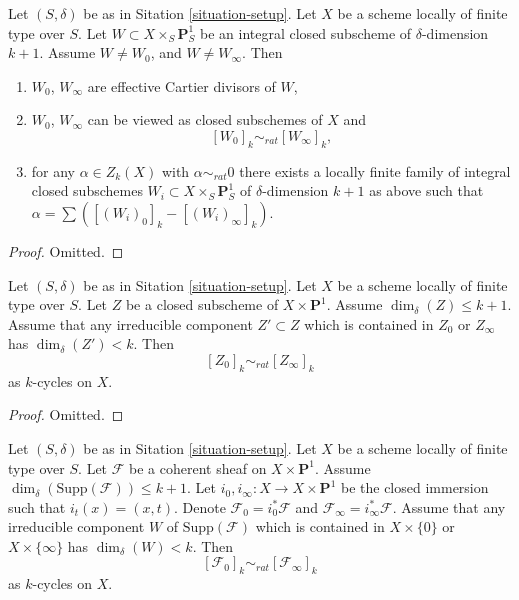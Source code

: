 \begin{lemma}
\label{lemma-rational-equivalence-family}
Let $(S, \delta)$ be as in Sitation \ref{situation-setup}.
Let $X$ be a scheme locally of finite type over $S$.
Let $W \subset X \times_S \mathbf{P}^1_S$ be an integral
closed subscheme of $\delta$-dimension $k + 1$.
Assume $W \not = W_0$, and $W \not = W_\infty$. Then
\begin{enumerate}
\item $W_0$, $W_\infty$ are effective Cartier divisors of $W$,
\item $W_0$, $W_\infty$ can be viewed as closed subschemes
of $X$ and
$$
[W_0]_k \sim_{rat} [W_\infty]_k,
$$
\item for any $\alpha \in Z_k(X)$ with $\alpha \sim_{rat} 0$
there exists a locally finite family of
integral closed subschemes $W_i \subset X \times_S \mathbf{P}^1_S$
of $\delta$-dimension $k + 1$
as above such that $\alpha = \sum ([(W_i)_0]_k - [(W_i)_\infty]_k)$.
\end{enumerate}
\end{lemma}

\begin{proof}
Omitted.
\end{proof}

\begin{lemma}
\label{lemma-closed-subscheme-cross-p1}
Let $(S, \delta)$ be as in Sitation \ref{situation-setup}.
Let $X$ be a scheme locally of finite type over $S$.
Let $Z$ be a closed subscheme of $X \times \mathbf{P}^1$.
Assume $\dim_\delta(Z) \leq k + 1$.
Assume that any irreducible component $Z' \subset Z$
which is contained in $Z_0$ or $Z_\infty$ has
$\dim_\delta(Z') < k$. Then
$$
[Z_0]_k \sim_{rat} [Z_\infty]_k
$$
as $k$-cycles on $X$.
\end{lemma}

\begin{proof}
Omitted.
\end{proof}

\begin{lemma}
\label{lemma-coherent-sheaf-cross-p1}
Let $(S, \delta)$ be as in Sitation \ref{situation-setup}.
Let $X$ be a scheme locally of finite type over $S$.
Let $\mathcal{F}$ be a coherent sheaf on $X \times \mathbf{P}^1$.
Assume
$
\dim_\delta(\text{Supp}(\mathcal{F})) \leq k + 1.
$
Let $i_0, i_\infty : X \to X \times \mathbf{P}^1$ be the closed immersion
such that $i_t(x) = (x, t)$. Denote $\mathcal{F}_0 = i_0^*\mathcal{F}$ and
$\mathcal{F}_\infty = i_\infty^*\mathcal{F}$.
Assume that any irreducible component $W$ of $\text{Supp}(\mathcal{F})$
which is contained in $X \times \{0\}$ or $X \times \{\infty\}$ has
$\dim_\delta(W) < k$. Then
$$
[\mathcal{F}_0]_k \sim_{rat} [\mathcal{F}_\infty]_k
$$
as $k$-cycles on $X$.
\end{lemma}

